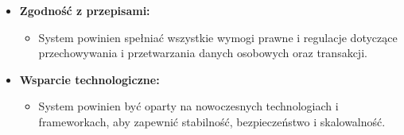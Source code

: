 \begin{itemize}
    \item \textbf{Zgodność z przepisami:}
    \begin{itemize}
        \item System powinien spełniać wszystkie wymogi prawne i regulacje dotyczące przechowywania i przetwarzania danych osobowych oraz transakcji.
    \end{itemize}
    
    \item \textbf{Wsparcie technologiczne:}
    \begin{itemize}
        \item System powinien być oparty na nowoczesnych technologiach i frameworkach, aby zapewnić stabilność, bezpieczeństwo i skalowalność.
    \end{itemize}
\end{itemize}






